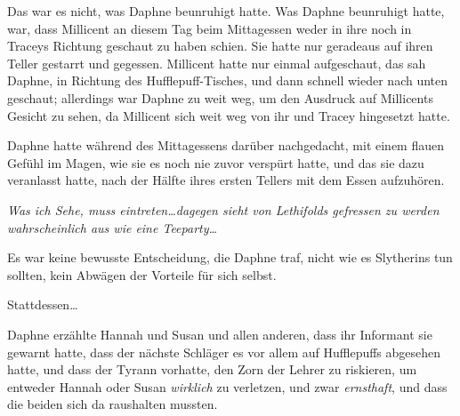 Das war es nicht, was Daphne beunruhigt hatte. Was Daphne beunruhigt hatte, war, dass Millicent an diesem Tag beim Mittagessen weder in ihre noch in Traceys Richtung geschaut zu haben schien. Sie hatte nur geradeaus auf ihren Teller gestarrt und gegessen. Millicent hatte nur einmal aufgeschaut, das sah Daphne, in Richtung des Hufflepuff-Tisches, und dann schnell wieder nach unten geschaut; allerdings war Daphne zu weit weg, um den Ausdruck auf Millicents Gesicht zu sehen, da Millicent sich weit weg von ihr und Tracey hingesetzt hatte.

Daphne hatte während des Mittagessens darüber nachgedacht, mit einem flauen Gefühl im Magen, wie sie es noch nie zuvor verspürt hatte, und das sie dazu veranlasst hatte, nach der Hälfte ihres ersten Tellers mit dem Essen aufzuhören.

\emph{Was ich Sehe, muss eintreten…dagegen sieht von Lethifolds gefressen zu werden wahrscheinlich aus wie eine Teeparty…}

Es war keine bewusste Entscheidung, die Daphne traf, nicht wie es Slytherins tun sollten, kein Abwägen der Vorteile für sich selbst.

Stattdessen…

Daphne erzählte Hannah und Susan und allen anderen, dass ihr Informant sie gewarnt hatte, dass der nächste Schläger es vor allem auf Hufflepuffs abgesehen hatte, und dass der Tyrann vorhatte, den Zorn der Lehrer zu riskieren, um entweder Hannah oder Susan \emph{wirklich} zu verletzen, und zwar \emph{ernsthaft}, und dass die beiden sich da raushalten mussten.

